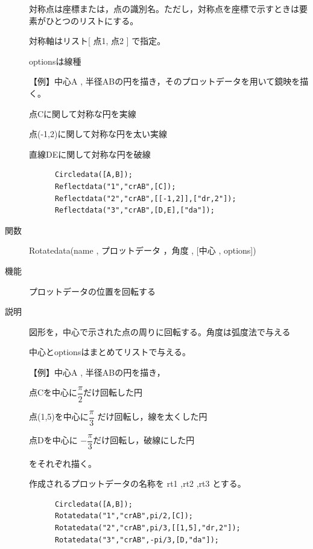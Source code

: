 \documentclass[papersize,a4paper,12pt,uplatex]{jsarticle}
\begin{document}
\begin{description}
  対称点は座標または，点の識別名。ただし，対称点を座標で示すときは要素がひとつのリストにする。
  
  対称軸はリスト[ 点1, 点2 ]  で指定。
  
  optionsは線種

\vspace{\baselineskip}
【例】中心A , 半径ABの円を描き，そのプロットデータを用いて鏡映を描く。

点Cに関して対称な円を実線

点(-1,2)に関して対称な円を太い実線

直線DEに関して対称な円を破線

\begin{verbatim}
      Circledata([A,B]);
      Reflectdata("1","crAB",[C]);
      Reflectdata("2","crAB",[[-1,2]],["dr,2"]);
      Reflectdata("3","crAB",[D,E],["da"]);
\end{verbatim}
\vspace{\baselineskip}
 \begin{center}  \end{center}


\vspace{\baselineskip}
\hypertarget{rotatedata}{}
\item[関数]  Rotatedata(name , プロットデータ ，角度 , [中心 , options])
\item[機能]  プロットデータの位置を回転する
\item[説明]  図形を，中心で示された点の周りに回転する。角度は弧度法で与える

  中心とoptionsはまとめてリストで与える。

\begin{spacing}{1.5}
【例】中心A , 半径ABの円を描き，

 点Cを中心に$\dfrac{\pi}{2} $だけ回転した円
 
 点(1,5)を中心に$\dfrac{\pi}{3}$ だけ回転し，線を太くした円
 
 点Dを中心に $-\dfrac{\pi}{3} $だけ回転し，破線にした円
 
をそれぞれ描く。
\end{spacing}
 作成されるプロットデータの名称を rt1 ,rt2 ,rt3 とする。

\begin{verbatim}
      Circledata([A,B]);
      Rotatedata("1","crAB",pi/2,[C]);
      Rotatedata("2","crAB",pi/3,[[1,5],"dr,2"]);
      Rotatedata("3","crAB",-pi/3,[D,"da"]);
\end{verbatim}
\vspace{\baselineskip}
  \begin{center}  \end{center}


\end{description}
\end{document}
